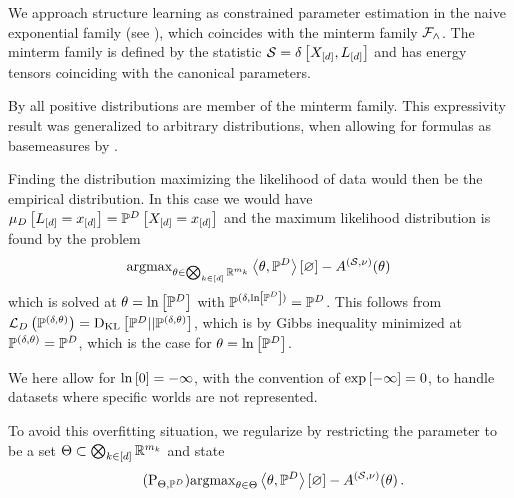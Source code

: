 
We approach structure learning as constrained parameter estimation in the naive exponential family (see ), which coincides with the minterm family $\mathcal{F}_{\land}$.
The minterm family is defined by the statistic $\mathcal{S} = \delta\left[X_{[d]}, L_{[d]}\right]$ and has energy tensors coinciding with the canonical parameters.



By  all positive distributions are member of the minterm \MarkovLogicNetwork{} family.
This expressivity result was generalized to arbitrary distributions, when allowing for formulas as basemeasures by .

Finding the distribution maximizing the likelihood of data would then be the empirical distribution.
In this case we would have $\mu_{D}\left[L_{[d]}=x_{[d]}\right] = \mathbb{P}^{D}\left[X_{[d]}=x_{[d]}\right]$ and the maximum likelihood distribution is found by the problem
\begin{align*}
    \mathrm{argmax}_{\theta\in\bigotimes_{k\in[d]} \mathbb{R}^{m_{k}}}  \left\langle \theta,\mathbb{P}^{D}\right\rangle \left[ \varnothing \right] - A^{(\mathcal{S},\nu)}(\theta) \,
\end{align*}
which is solved at $\theta=\ln \left[ \mathbb{P}^{D} \right]$ with $\mathbb{P}^{(\delta,\ln \left[ \mathbb{P}^{D} \right])}= \mathbb{P}^{D}$.
This follows from $\mathcal{L}_{D}\left(\mathbb{P}^{(\delta,\theta)}\right)=\mathrm{D}_{\mathrm{KL}}\left[ \mathbb{P}^{D} || \mathbb{P}^{(\delta,\theta)} \right]$, which is by Gibbs inequality minimized at $\mathbb{P}^{(\delta,\theta)}=\mathbb{P}^{D}$, which is the case for $\theta = \ln \left[ \mathbb{P}^{D} \right]$.

We here allow for $\ln \left[ 0 \right]=-\infty$, with the convention of $\mathrm{exp}\left[-\infty\right]=0$, to handle datasets where specific worlds are not represented.


To avoid this overfitting situation, we regularize by restricting the parameter to be a set $\Theta\subset\bigotimes_{k\in[d]} \mathbb{R}^{m_{k}}$ and state
\begin{align}
    \label{prob:restrictedNaiveMLE}\tag{$\mathrm{P}_{\energyhypothesis, \empdistribution}$}
    \argmax_{\canparam\in\energyhypothesis}  \contraction{\canparam,\empdistribution} - \cumfunctionof{\canparam} \, .
\end{align}

